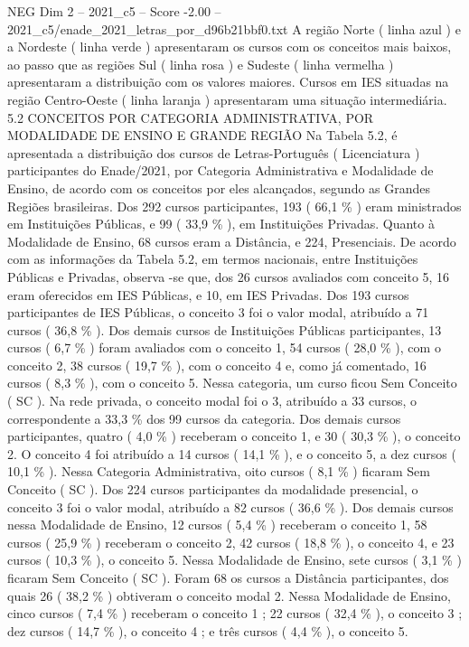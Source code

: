 \begin{textsample}{NEG Dim 2 – 2021\_c5 – Score -2.00 – 2021\_c5/enade\_2021\_letras\_por\_d96b21bbf0.txt}
A região Norte ( linha azul ) e a Nordeste ( linha verde ) apresentaram os cursos com os conceitos mais baixos, ao passo que as regiões Sul ( linha rosa ) e Sudeste ( linha vermelha ) apresentaram a distribuição com os valores maiores.
Cursos em IES situadas na região Centro-Oeste ( linha laranja ) apresentaram uma situação intermediária. 5.2 CONCEITOS POR CATEGORIA ADMINISTRATIVA, POR MODALIDADE DE ENSINO E GRANDE REGIÃO Na Tabela 5.2, é apresentada a distribuição dos cursos de Letras-Português ( Licenciatura ) participantes do Enade/2021, por Categoria Administrativa e Modalidade de Ensino, de acordo com os conceitos por eles alcançados, segundo as Grandes Regiões brasileiras.
Dos 292 cursos participantes, 193 ( 66,1 \% ) eram ministrados em Instituições Públicas, e 99 ( 33,9 \% ), em Instituições Privadas.
Quanto à Modalidade de Ensino, 68 cursos eram a Distância, e 224, Presenciais.
De acordo com as informações da Tabela 5.2, em termos nacionais, entre Instituições Públicas e Privadas, observa -se que, dos 26 cursos avaliados com conceito 5, 16 eram oferecidos em IES Públicas, e 10, em IES Privadas.
Dos 193 cursos participantes de IES Públicas, o conceito 3 foi o valor modal, atribuído a 71 cursos ( 36,8 \% ).
Dos demais cursos de Instituições Públicas participantes, 13 cursos ( 6,7 \% ) foram avaliados com o conceito 1, 54 cursos ( 28,0 \% ), com o conceito 2, 38 cursos ( 19,7 \% ), com o conceito 4 e, como já comentado, 16 cursos ( 8,3 \% ), com o conceito 5.
Nessa categoria, um curso ficou Sem Conceito ( SC ).
Na rede privada, o conceito modal foi o 3, atribuído a 33 cursos, o correspondente a 33,3 \% dos 99 cursos da categoria.
Dos demais cursos participantes, quatro ( 4,0 \% ) receberam o conceito 1, e 30 ( 30,3 \% ), o conceito 2.
O conceito 4 foi atribuído a 14 cursos ( 14,1 \% ), e o conceito 5, a dez cursos ( 10,1 \% ).
Nessa Categoria Administrativa, oito cursos ( 8,1 \% ) ficaram Sem Conceito ( SC ).
Dos 224 cursos participantes da modalidade presencial, o conceito 3 foi o valor modal, atribuído a 82 cursos ( 36,6 \% ).
Dos demais cursos nessa Modalidade de Ensino, 12 cursos ( 5,4 \% ) receberam o conceito 1, 58 cursos ( 25,9 \% ) receberam o conceito 2, 42 cursos ( 18,8 \% ), o conceito 4, e 23 cursos ( 10,3 \% ), o conceito 5.
Nessa Modalidade de Ensino, sete cursos ( 3,1 \% ) ficaram Sem Conceito ( SC ).
Foram 68 os cursos a Distância participantes, dos quais 26 ( 38,2 \% ) obtiveram o conceito modal 2.
Nessa Modalidade de Ensino, cinco cursos ( 7,4 \% ) receberam o conceito 1 ; 22 cursos ( 32,4 \% ), o conceito 3 ; dez cursos ( 14,7 \% ), o conceito 4 ; e três cursos ( 4,4 \% ), o conceito 5.

\end{textsample}
